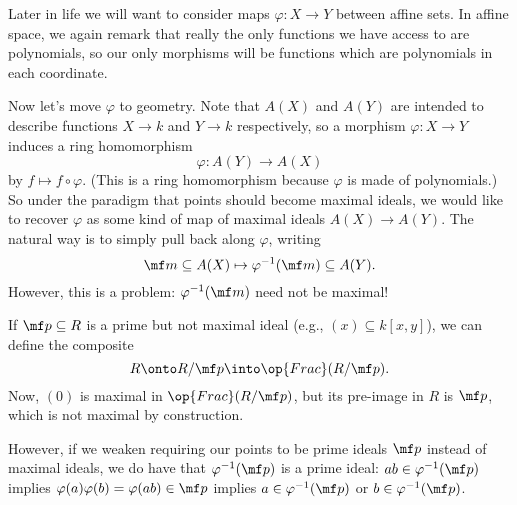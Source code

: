 \documentclass[../notes.tex]{subfiles}
\begin{document}
Later in life we will want to consider maps $\varphi:X\to Y$ between affine sets. In affine space, we again remark that really the only functions we have access to are polynomials, so our only morphisms will be functions which are polynomials in each coordinate.

Now let's move $\varphi$ to geometry. Note that $A(X)$ and $A(Y)$ are intended to describe functions $X\to k$ and $Y\to k$ respectively, so a morphism $\varphi:X\to Y$ induces a ring homomorphism
\[\varphi:A(Y)\rightarrow A(X)\]
by $f\mapsto f\circ\varphi$. (This is a ring homomorphism because $\varphi$ is made of polynomials.) So under the paradigm that points should become maximal ideals, we would like to recover $\varphi$ as some kind of map of maximal ideals $A(X)\to A(Y)$. The natural way is to simply pull back along $\varphi$, writing
\[\mf m\subseteq A(X)\mapsto\varphi^{-1}(\mf m)\subseteq A(Y).\]
However, this is a problem: $\varphi^{-1}(\mf m)$ need not be maximal!
\begin{example}
	If $\mf p\subseteq R$ is a prime but not maximal ideal (e.g., $(x)\subseteq k[x,y]$), we can define the composite
	\[R\onto R/\mf p\into\op{Frac}(R/\mf p).\]
	Now, $(0)$ is maximal in $\op{Frac}(R/\mf p)$, but its pre-image in $R$ is $\mf p$, which is not maximal by construction.
\end{example}
However, if we weaken requiring our points to be prime ideals $\mf p$ instead of maximal ideals, we do have that $\varphi^{-1}(\mf p)$ is a prime ideal: $ab\in\varphi^{-1}(\mf p)$ implies $\varphi(a)\varphi(b)=\varphi(ab)\in\mf p$ implies $a\in\varphi^{-1}(\mf p)$ or $b\in\varphi^{-1}(\mf p)$.
\end{document}
